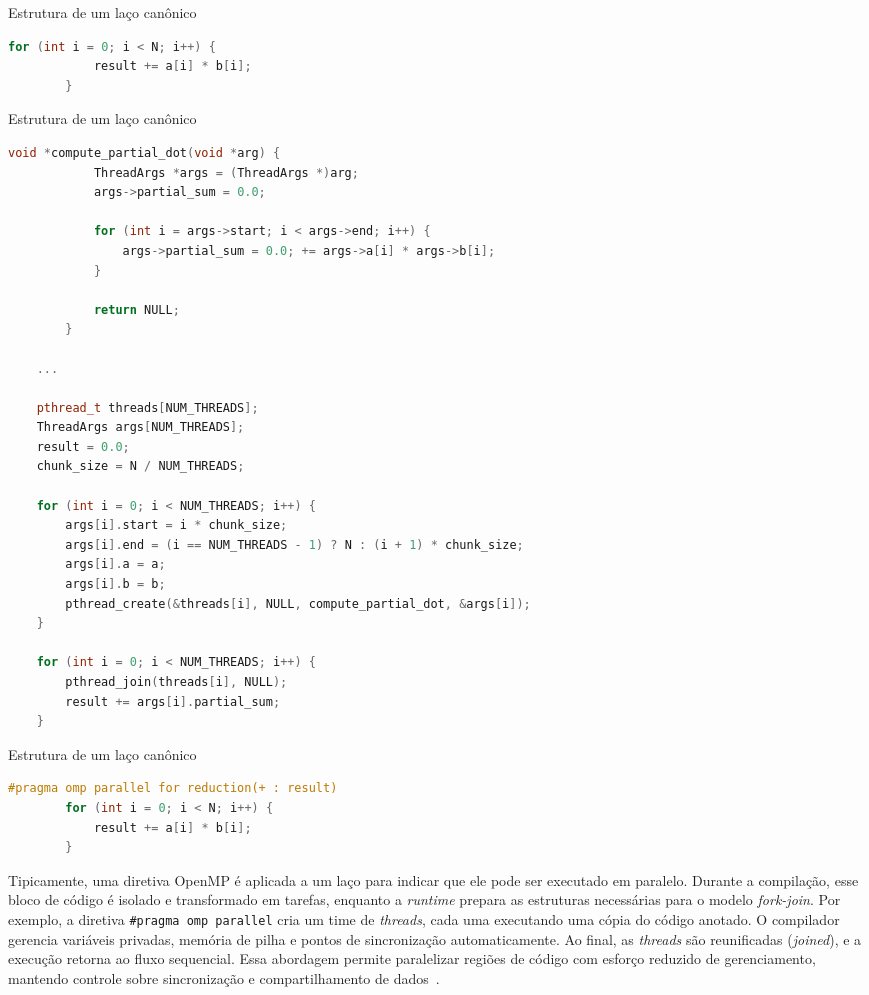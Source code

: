 \begin{sourcecode}[htb]\caption{\label{code:produtoVet}Estrutura de um laço canônico}
    \begin{lstlisting}[frame=single, language=C++]
        for (int i = 0; i < N; i++) {
            result += a[i] * b[i];
        }
    \end{lstlisting}
    \fonte{}
\end{sourcecode}

\begin{sourcecode}[htb]\caption{\label{code:produtoThread}Estrutura de um laço canônico}
    \begin{lstlisting}[frame=single, language=C++]
        void *compute_partial_dot(void *arg) {
            ThreadArgs *args = (ThreadArgs *)arg;
            args->partial_sum = 0.0;
            
            for (int i = args->start; i < args->end; i++) {
                args->partial_sum = 0.0; += args->a[i] * args->b[i];
            }

            return NULL;
        }

    ...

    pthread_t threads[NUM_THREADS];
    ThreadArgs args[NUM_THREADS];
    result = 0.0;
    chunk_size = N / NUM_THREADS;

    for (int i = 0; i < NUM_THREADS; i++) {
        args[i].start = i * chunk_size;
        args[i].end = (i == NUM_THREADS - 1) ? N : (i + 1) * chunk_size;
        args[i].a = a;
        args[i].b = b;
        pthread_create(&threads[i], NULL, compute_partial_dot, &args[i]);
    }

    for (int i = 0; i < NUM_THREADS; i++) {
        pthread_join(threads[i], NULL);
        result += args[i].partial_sum;    
    }
    \end{lstlisting}
    \fonte{}
\end{sourcecode}

\begin{sourcecode}[htb]\caption{\label{code:produtoOmp}Estrutura de um laço canônico}
    \begin{lstlisting}[frame=single, language=C++]
        #pragma omp parallel for reduction(+ : result)
        for (int i = 0; i < N; i++) {
            result += a[i] * b[i];
        }
    \end{lstlisting}
    \fonte{}
\end{sourcecode}

Tipicamente, uma diretiva OpenMP é aplicada a um laço para indicar que ele pode ser executado em paralelo. Durante a compilação, esse bloco de código é isolado e transformado em tarefas, enquanto a \textit{runtime} prepara as estruturas necessárias para o modelo \textit{fork-join}. Por exemplo, a diretiva \texttt{\#pragma omp parallel} cria um time de \textit{threads}, cada uma executando uma cópia do código anotado. O compilador gerencia variáveis privadas, memória de pilha e pontos de sincronização automaticamente. Ao final, as \textit{threads} são reunificadas (\textit{joined}), e a execução retorna ao fluxo sequencial. Essa abordagem permite paralelizar regiões de código com esforço reduzido de gerenciamento, mantendo controle sobre sincronização e compartilhamento de dados~\cite{mattson2019}.

